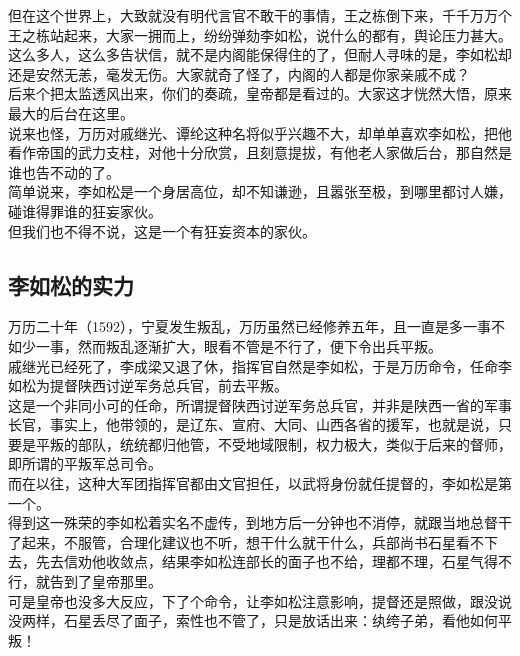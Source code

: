 \begin{multicols}{\theparacolNo}
但在这个世界上，大致就没有明代言官不敢干的事情，王之栋倒下来，千千万万个王之栋站起来，大家一拥而上，纷纷弹劾李如松，说什么的都有，舆论压力甚大。\\

这么多人，这么多告状信，就不是内阁能保得住的了，但耐人寻味的是，李如松却还是安然无恙，毫发无伤。大家就奇了怪了，内阁的人都是你家亲戚不成？\\

后来个把太监透风出来，你们的奏疏，皇帝都是看过的。大家这才恍然大悟，原来最大的后台在这里。\\

说来也怪，万历对戚继光、谭纶这种名将似乎兴趣不大，却单单喜欢李如松，把他看作帝国的武力支柱，对他十分欣赏，且刻意提拔，有他老人家做后台，那自然是谁也告不动的了。\\

简单说来，李如松是一个身居高位，却不知谦逊，且嚣张至极，到哪里都讨人嫌，碰谁得罪谁的狂妄家伙。\\

但我们也不得不说，这是一个有狂妄资本的家伙。\\

\subsection{李如松的实力}
万历二十年（1592），宁夏发生叛乱，万历虽然已经修养五年，且一直是多一事不如少一事，然而叛乱逐渐扩大，眼看不管是不行了，便下令出兵平叛。\\

戚继光已经死了，李成梁又退了休，指挥官自然是李如松，于是万历命令，任命李如松为提督陕西讨逆军务总兵官，前去平叛。\\

这是一个非同小可的任命，所谓提督陕西讨逆军务总兵官，并非是陕西一省的军事长官，事实上，他带领的，是辽东、宣府、大同、山西各省的援军，也就是说，只要是平叛的部队，统统都归他管，不受地域限制，权力极大，类似于后来的督师，即所谓的平叛军总司令。\\

而在以往，这种大军团指挥官都由文官担任，以武将身份就任提督的，李如松是第一个。\\

得到这一殊荣的李如松着实名不虚传，到地方后一分钟也不消停，就跟当地总督干了起来，不服管，合理化建议也不听，想干什么就干什么，兵部尚书石星看不下去，先去信劝他收敛点，结果李如松连部长的面子也不给，理都不理，石星气得不行，就告到了皇帝那里。\\

可是皇帝也没多大反应，下了个命令，让李如松注意影响，提督还是照做，跟没说没两样，石星丢尽了面子，索性也不管了，只是放话出来：纨绔子弟，看他如何平叛！\\


\end{multicols}
